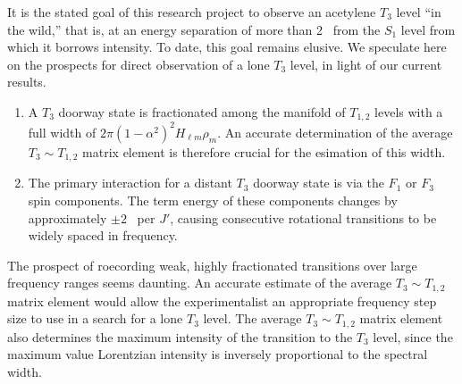 It is the stated goal of this research project to observe an acetylene
$T_3$ level ``in the wild,'' that is, at an energy separation of more
than 2 \rcm\ from the $S_1$ level from which it borrows intensity.  To
date, this goal remains elusive.  We speculate here on the prospects
for direct observation of a lone $T_3$ level, in light of our current
results.
\begin{enumerate}
\item A $T_3$ doorway state is fractionated among the manifold of
  $T_{1,2}$ levels with a full width of $2 \pi (1-\alpha^2)^2 H_{\ell
    m} \rho_m$.  An accurate determination of the average $T_3 \sim
  T_{1,2}$ matrix element is therefore crucial for the esimation of
  this width.
\item The primary interaction for a distant $T_3$ doorway state is via
  the $F_1$ or $F_3$ spin components.  The term energy of these
  components changes by approximately $\pm 2$ \rcm\ per $J'$, causing
  consecutive rotational transitions to be widely spaced in frequency.
\end{enumerate}
The prospect of roecording weak, highly fractionated transitions over
large frequency ranges seems daunting.  An accurate estimate of the
average $T_3 \sim T_{1,2}$ matrix element would allow the
experimentalist an appropriate frequency step size to use in a search
for a lone $T_3$ level.  The average $T_3 \sim T_{1,2}$ matrix element
also determines the maximum intensity of the transition to the $T_3$
level, since the maximum value Lorentzian intensity is inversely
proportional to the spectral width.





% 
% 
% 

